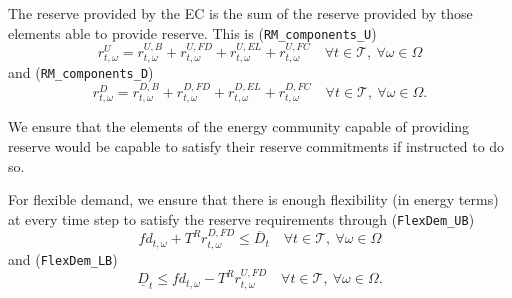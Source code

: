 \documentclass{article}
\begin{document}
The reserve provided by the EC is the sum of the reserve provided by those elements able to provide reserve. This is (\verb|RM_components_U|)
\begin{equation} \label{EQ:RUcomp}
    r^{U}_{t,\omega} = r^{U,B}_{t,\omega} + r^{U,FD}_{t,\omega}
  + r^{U,EL}_{t,\omega} + r^{U,FC}_{t,\omega} \quad \forall t \in \mathcal{T}, \ \forall \omega \in \Omega
\end{equation}
and (\verb|RM_components_D|)
\begin{equation} \label{EQ:RDcomp}
	r^{D}_{t,\omega} = r^{D,B}_{t,\omega} + r^{D,FD}_{t,\omega}
  + r^{D,EL}_{t,\omega} + r^{D,FC}_{t,\omega} \quad \forall t \in \mathcal{T}, \ \forall \omega \in \Omega.
\end{equation}


We ensure that the elements of the energy community capable of providing reserve would be capable to satisfy their reserve commitments if instructed to do so. 

For flexible demand, we ensure that there is enough flexibility (in energy terms) at every time step to satisfy the reserve requirements through (\verb|FlexDem_UB|)
\begin{equation} \label{EQ:FlexDemand_UB}
	fd_{t, \omega} + T^R r^{D, FD}_{t, \omega} \leq \overline{D}_t \quad \forall t \in \mathcal{T}, \ \forall \omega \in \Omega
\end{equation}
and (\verb|FlexDem_LB|)
\begin{equation} \label{EQ:FlexDemand_LB}
	\underline{D}_t \leq fd_{t, \omega} - T^R r^{U, FD}_{t, \omega} \quad \forall t \in \mathcal{T}, \ \forall \omega \in \Omega.
\end{equation}
\end{document}
